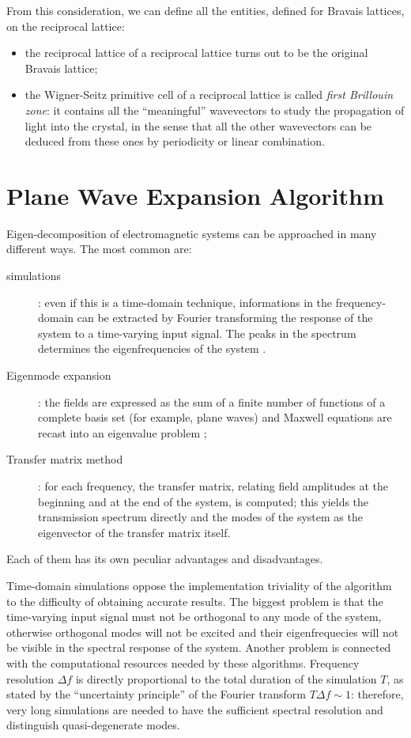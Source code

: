 From this consideration, we can define all the entities, defined for
Bravais lattices, on the reciprocal lattice:
\begin{itemize}
\item
  the reciprocal lattice of a reciprocal lattice turns out to be the original
  Bravais lattice;
\item
  the Wigner-Seitz primitive cell of a reciprocal lattice is called
  \emph{first Brillouin zone}: it contains all the ``meaningful''
  wavevectors to study the propagation of light into the crystal, in
  the sense that all the other wavevectors can be deduced from these
  ones by periodicity or linear combination.
\end{itemize}

\section{Plane Wave Expansion Algorithm} \label{sec:pwe}

Eigen-decomposition of electromagnetic systems can be approached in
many different ways. The most common are:
\begin{description}
\item[\FDTD simulations]: even if this is a time-domain technique,
  informations in the frequency-domain can be extracted by Fourier
  transforming the response of the system to a time-varying input
  signal. The peaks in the spectrum determines the eigenfrequencies of
  the system \cite{chan_order_n}.
\item[Eigenmode expansion]: the fields are expressed as the sum of a
  finite number of functions of a complete basis set (for example,
  plane waves) and Maxwell equations are recast into an eigenvalue
  problem \cite{johnson_block,tayeb_rigorous};
\item[Transfer matrix method]: for each frequency, the transfer
  matrix, relating field amplitudes at the beginning and at the end of
  the system, is computed; this yields the transmission spectrum
  directly and the modes of the system as the eigenvector of the
  transfer matrix itself.
\end{description}

Each of them has its own peculiar advantages and disadvantages.

Time-domain simulations oppose the implementation triviality of the
algorithm to the difficulty of obtaining accurate results. The biggest
problem is that the time-varying input signal must not be orthogonal
to any mode of the system, otherwise orthogonal modes will not be
excited and their eigenfrequecies will not be visible in the spectral
response of the system. Another problem is connected with the
computational resources needed by these algorithms. Frequency
resolution $\Delta f$ is directly proportional to the total duration
of the simulation $T$, as stated by the ``uncertainty principle'' of
the Fourier transform $T\Delta f \sim 1$: therefore, very long
simulations are needed to have the sufficient spectral resolution and
distinguish quasi-degenerate modes.

